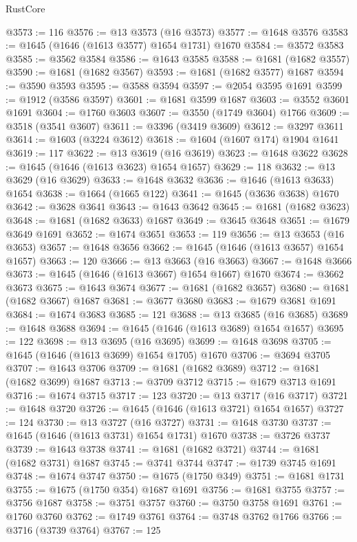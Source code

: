 \begin{lexlean}{RustCore}
\begin{coremodule}
@3573 := 116
@3576 := @13 @3573 (@16 @3573)
@3577 := @1648 @3576
@3583 := @1645 (@1646 (@1613 @3577) @1654 @1731) @1670
@3584 := @3572 @3583
@3585 := @3562 @3584
@3586 := @1643 @3585
@3588 := @1681 (@1682 @3557)
@3590 := @1681 (@1682 @3567)
@3593 := @1681 (@1682 @3577) @1687
@3594 := @3590 @3593
@3595 := @3588 @3594
@3597 := @2054 @3595 @1691
@3599 := @1912 (@3586 @3597)
@3601 := @1681 @3599 @1687
@3603 := @3552 @3601 @1691
@3604 := @1760 @3603
@3607 := @3550 (@1749 @3604) @1766
@3609 := @3518 (@3541 @3607)
@3611 := @3396 (@3419 @3609)
@3612 := @3297 @3611
@3614 := @1603 (@3224 @3612)
@3618 := @1604 (@1607 @174) @1904 @1641
@3619 := 117
@3622 := @13 @3619 (@16 @3619)
@3623 := @1648 @3622
@3628 := @1645 (@1646 (@1613 @3623) @1654 @1657)
@3629 := 118
@3632 := @13 @3629 (@16 @3629)
@3633 := @1648 @3632
@3636 := @1646 (@1613 @3633) @1654
@3638 := @1664 (@1665 @122)
@3641 := @1645 (@3636 @3638) @1670
@3642 := @3628 @3641
@3643 := @1643 @3642
@3645 := @1681 (@1682 @3623)
@3648 := @1681 (@1682 @3633) @1687
@3649 := @3645 @3648
@3651 := @1679 @3649 @1691
@3652 := @1674 @3651
@3653 := 119
@3656 := @13 @3653 (@16 @3653)
@3657 := @1648 @3656
@3662 := @1645 (@1646 (@1613 @3657) @1654 @1657)
@3663 := 120
@3666 := @13 @3663 (@16 @3663)
@3667 := @1648 @3666
@3673 := @1645 (@1646 (@1613 @3667) @1654 @1667) @1670
@3674 := @3662 @3673
@3675 := @1643 @3674
@3677 := @1681 (@1682 @3657)
@3680 := @1681 (@1682 @3667) @1687
@3681 := @3677 @3680
@3683 := @1679 @3681 @1691
@3684 := @1674 @3683
@3685 := 121
@3688 := @13 @3685 (@16 @3685)
@3689 := @1648 @3688
@3694 := @1645 (@1646 (@1613 @3689) @1654 @1657)
@3695 := 122
@3698 := @13 @3695 (@16 @3695)
@3699 := @1648 @3698
@3705 := @1645 (@1646 (@1613 @3699) @1654 @1705) @1670
@3706 := @3694 @3705
@3707 := @1643 @3706
@3709 := @1681 (@1682 @3689)
@3712 := @1681 (@1682 @3699) @1687
@3713 := @3709 @3712
@3715 := @1679 @3713 @1691
@3716 := @1674 @3715
@3717 := 123
@3720 := @13 @3717 (@16 @3717)
@3721 := @1648 @3720
@3726 := @1645 (@1646 (@1613 @3721) @1654 @1657)
@3727 := 124
@3730 := @13 @3727 (@16 @3727)
@3731 := @1648 @3730
@3737 := @1645 (@1646 (@1613 @3731) @1654 @1731) @1670
@3738 := @3726 @3737
@3739 := @1643 @3738
@3741 := @1681 (@1682 @3721)
@3744 := @1681 (@1682 @3731) @1687
@3745 := @3741 @3744
@3747 := @1739 @3745 @1691
@3748 := @1674 @3747
@3750 := @1675 (@1750 @349)
@3751 := @1681 @1731
@3755 := @1675 (@1750 @354) @1687 @1691
@3756 := @1681 @3755
@3757 := @3756 @1687
@3758 := @3751 @3757
@3760 := @3750 @3758 @1691
@3761 := @1760 @3760
@3762 := @1749 @3761
@3764 := @3748 @3762 @1766
@3766 := @3716 (@3739 @3764)
@3767 := 125

\end{coremodule}
\end{lexlean}
